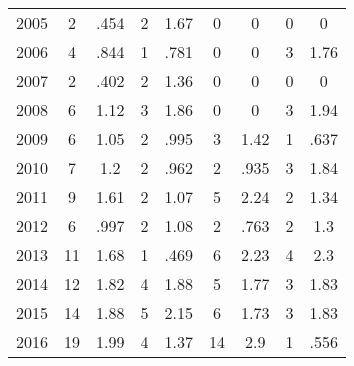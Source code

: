 \begin{table}[htbp]
\begin{tabular}{l*{8}{c}}
2005      &        2&     .454&        2&     1.67&        0&        0&        0&        0\\
2006      &        4&     .844&        1&     .781&        0&        0&        3&     1.76\\
2007      &        2&     .402&        2&     1.36&        0&        0&        0&        0\\
2008      &        6&     1.12&        3&     1.86&        0&        0&        3&     1.94\\
2009      &        6&     1.05&        2&     .995&        3&     1.42&        1&     .637\\
2010      &        7&      1.2&        2&     .962&        2&     .935&        3&     1.84\\
2011      &        9&     1.61&        2&     1.07&        5&     2.24&        2&     1.34\\
2012      &        6&     .997&        2&     1.08&        2&     .763&        2&      1.3\\
2013      &       11&     1.68&        1&     .469&        6&     2.23&        4&      2.3\\
2014      &       12&     1.82&        4&     1.88&        5&     1.77&        3&     1.83\\
2015      &       14&     1.88&        5&     2.15&        6&     1.73&        3&     1.83\\
2016      &       19&     1.99&        4&     1.37&       14&      2.9&        1&     .556\\
\hline\hline
\end{tabular}
\end{table}
